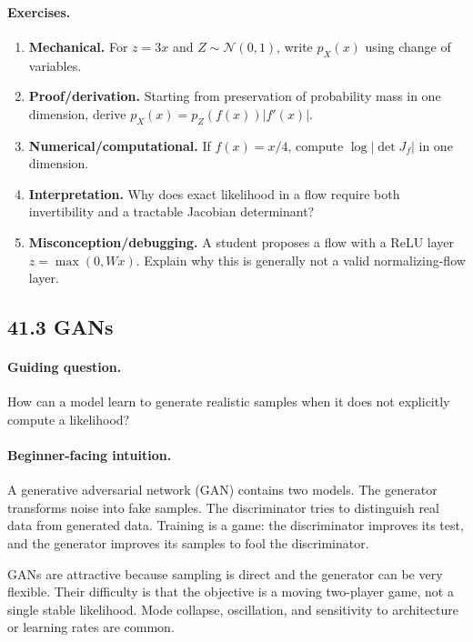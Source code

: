 \paragraph{Exercises.}
\begin{enumerate}[label=\textbf{41.2.\arabic*.}, leftmargin=*]
\item \textbf{Mechanical.} For \(z=3x\) and \(Z\sim\mathcal N(0,1)\), write \(p_X(x)\) using change of variables.
\item \textbf{Proof/derivation.} Starting from preservation of probability mass in one dimension, derive \(p_X(x)=p_Z(f(x))|f'(x)|\).
\item \textbf{Numerical/computational.} If \(f(x)=x/4\), compute \(\log|\det J_f|\) in one dimension.
\item \textbf{Interpretation.} Why does exact likelihood in a flow require both invertibility and a tractable Jacobian determinant?
\item \textbf{Misconception/debugging.} A student proposes a flow with a ReLU layer \(z=\max(0,Wx)\). Explain why this is generally not a valid normalizing-flow layer.
\end{enumerate}

\subsection{41.3 GANs}

\paragraph{Guiding question.}
How can a model learn to generate realistic samples when it does not explicitly compute a likelihood?

\paragraph{Beginner-facing intuition.}
A generative adversarial network (GAN) contains two models. The generator transforms noise into fake samples. The discriminator tries to distinguish real data from generated data. Training is a game: the discriminator improves its test, and the generator improves its samples to fool the discriminator.

GANs are attractive because sampling is direct and the generator can be very flexible. Their difficulty is that the objective is a moving two-player game, not a single stable likelihood. Mode collapse, oscillation, and sensitivity to architecture or learning rates are common.

